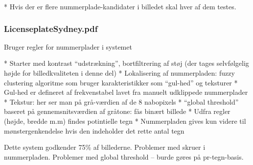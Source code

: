 * Hvis der er flere nummerplade-kandidater i billedet skal hver af dem testes.

\subsubsection*{LicenseplateSydney.pdf}

Bruger regler for nummerplader i systemet

    * Starter med kontrast “udstrækning”, bortfiltrering af støj (der tages selvfølgelig højde for billedkvaliteten i denne del)
    * Lokalisering af nummerpladen: fuzzy clustering algoritme som bruger karakteristikker som “gul-hed” og teksturer
    * Gul-hed er defineret af frekvenstabel lavet fra manuelt udklippede nummerplader
    * Tekstur: her ser man på grå-værdien af de 8 nabopixels
    * “global threshold” baseret på gennemsnitsværdien af gråtone: fås binært billede
    * Udfra regler (højde, bredde m.m) findes potintielle tegn
    * Nummerpladen gives kun videre til mønstergenkendelse hvis den indeholder det rette antal tegn

Dette system godkender 75\% af billederne. Problemer med skruer i nummerpladen. Problemer med global threshold – burde gøres på pr-tegn-basis.